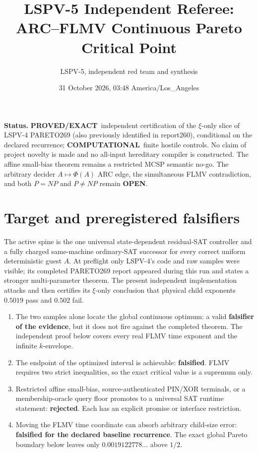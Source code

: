 \documentclass[11pt]{article}
\title{LSPV-5 Independent Referee:\\ARC--FLMV Continuous Pareto Critical Point}
\author{LSPV-5, independent red team and synthesis}
\date{31 October 2026, 03:48 America/Los\_Angeles}
\newcommand{\OPEN}{\textbf{OPEN}}
\newcommand{\PROVED}{\textbf{PROVED/EXACT}}
\newcommand{\COMP}{\textbf{COMPUTATIONAL}}
\begin{document}
\maketitle

\noindent\textbf{Status.} \PROVED\ independent certification of the
$\xi$-only slice of LSPV-4 PARETO269 (also previously identified in report260),
conditional on the declared recurrence; \COMP\ finite hostile controls.  No
claim of project novelty is made and no all-input hereditary compiler is
constructed.  The affine
small-bias theorem remains a restricted MCSP semantic no-go.  The arbitrary
decider $A\mapsto\Phi(A)$ ARC edge, the simultaneous FLMV contradiction, and
both $P=NP$ and $P\ne NP$ remain \OPEN.

\section{Target and preregistered falsifiers}
The active spine is the one universal state-dependent residual-SAT controller
and a fully charged same-machine ordinary-SAT successor for every correct
uniform deterministic guest $A$.  At preflight only LSPV-4's code and raw
samples were visible; its completed PARETO269 report appeared during this run
and states a stronger multi-parameter theorem.  The present independent
implementation attacks and then certifies its $\xi$-only conclusion that
physical child exponents $0.5019$ pass and $0.502$ fail.

\begin{enumerate}
\item The two samples alone locate the global continuous optimum: a valid
\textbf{falsifier of the evidence}, but it does not fire against the completed
theorem.  The independent proof below covers every real FLMV time exponent and
the infinite $k$-envelope.
\item The endpoint of the optimized interval is achievable:
\textbf{falsified}.  FLMV requires two strict inequalities, so the exact
critical value is a supremum only.
\item Restricted affine small-bias, source-authenticated PIN/XOR terminals, or
a membership-oracle query floor promotes to a universal SAT runtime statement:
\textbf{rejected}.  Each has an explicit promise or interface restriction.
\item Moving the FLMV time coordinate can absorb arbitrary child-size error:
\textbf{falsified for the declared baseline recurrence}.  The exact global
Pareto boundary below leaves only $0.0019122778\ldots$ above $1/2$.
\end{enumerate}
\end{document}
